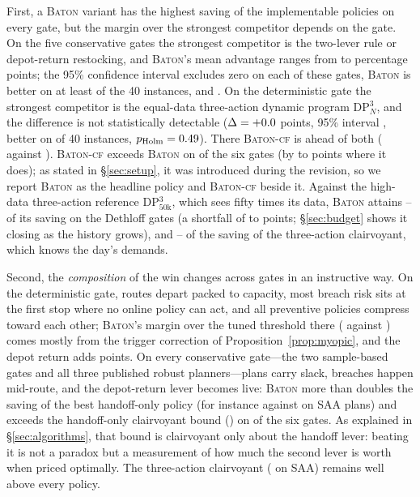 \documentclass[preprint,authoryear,12pt]{elsarticle}
\theoremstyle{definition}
\theoremstyle{remark}
\begin{document}


First, a \textsc{Baton} variant has the highest saving of the
implementable policies on every gate, but the margin over the strongest
competitor depends on the gate. On the five conservative gates the
strongest competitor is the two-lever rule or depot-return restocking,
and \textsc{Baton}'s mean advantage ranges from \statConsDeltaMin{} to
\statConsDeltaMax{} percentage points; the 95\% confidence interval
excludes zero on each of these gates, \textsc{Baton} is better on at
least \statConsWinMin{} of the 40 instances, and \statConsPmax{}. On the
deterministic gate the strongest competitor is the equal-data
three-action dynamic program DP$^3_N$, and the difference is not
statistically detectable
($\Delta = +0.0$ points, 95\% interval \statDetCI, better on
\statDetWin{} of 40 instances, $p_{\mathrm{Holm}} = 0.49$). There
\textsc{Baton-cf} is ahead of both (\svDetCf{} against \svDetBaton{}).
\textsc{Baton-cf} exceeds \textsc{Baton} on \nCfAbove{} of the six
gates (by \cfGapLo{} to \cfGapHi{} points where it does); as stated in \S\ref{sec:setup}, it was introduced during the
revision, so we report \textsc{Baton} as the headline policy and
\textsc{Baton-cf} beside it. Against the high-data three-action
reference DP$^3_{50\mathrm{k}}$, which sees fifty times its data,
\textsc{Baton} attains \ratioDpThreeLo--\ratioDpThreeHi{} of its saving
on the Dethloff gates (a shortfall of \statDpDeltaMax{} to
\statDpDeltaMin{} points; \S\ref{sec:budget} shows it closing as the
history grows), and \ratioOrcThreeLo--\ratioOrcThreeHi{} of the saving
of the three-action clairvoyant, which knows the day's demands.

Second, the \emph{composition} of the win changes across gates in an
instructive way. On the deterministic gate, routes depart packed to
capacity, most breach risk sits at the first stop where no online
policy can act, and all preventive policies compress toward each other;
\textsc{Baton}'s margin over the tuned threshold there (\svDetBaton{}
against \svDetThresh{}) comes mostly from the trigger correction of
Proposition~\ref{prop:myopic}, and the depot return adds
\detActGain{} points. On every conservative gate---the two sample-based gates and all
three published robust planners---plans carry slack, breaches happen
mid-route, and the depot-return lever becomes live: \textsc{Baton} more
than doubles the saving of the best handoff-only policy (for instance
\svSAABaton{} against \svSAAHo{} on \textsc{SAA} plans) and exceeds the
handoff-only clairvoyant bound (\svSAAOrc{}) on \nOrcBeat{} of the six
gates. As explained in \S\ref{sec:algorithms}, that bound is clairvoyant
only about the handoff lever: beating it is not a paradox but a
measurement of how much the second lever is worth when priced
optimally. The three-action clairvoyant (\svSAAOrcThree{} on
\textsc{SAA}) remains well above every policy.
\end{document}
